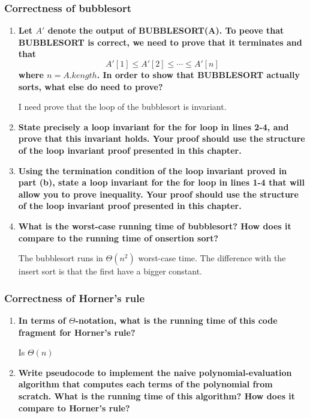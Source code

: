 \documentclass[a4paper,12pt]{article}
\begin{document}
    \subsubsection{Correctness of bubblesort}
    
    \begin{enumerate}
     \item \textbf{ Let $A'$ denote the output of BUBBLESORT(A). To peove
     that BUBBLESORT is correct, we need to prove that it terminates and that
     $$A'[1]\leq A'[2] \leq \cdots \leq A'[n]$$
     where $n = A.kength$. In order to show that BUBBLESORT actually
     sorts, what else do need to prove?}
     
     I need prove that the loop of the bubblesort is invariant.
     
     \item \textbf{State precisely a loop invariant for the for loop in lines 2-4, and
     prove that this invariant holds. Your proof should use the structure of the loop invariant
     proof presented in this chapter.}
     
     \item \textbf{Using the termination condition of the loop invariant proved
     in part (b), state a loop invariant for the for loop in lines 1-4 that will
     allow you to prove inequality. Your proof should use the structure of the loop invariant
     proof presented in this chapter.}
     
     \item \textbf{What is the worst-case running time of bubblesort? How does it compare to
     the running time of onsertion sort?}
     
     The bubblesort runs in $\Theta(n^2)$ worst-case time. The difference
     with the insert sort is that the first have a bigger constant.
     
    \end{enumerate}
    
    \subsubsection{Correctness of Horner's rule}
    
    \begin{enumerate}
     \item \textbf{In terms of $\Theta$-notation, what is the running
     time of this code fragment for Horner's rule?}
     
     Is $\Theta(n)$
     
     \item \textbf{Write pseudocode to implement the naive polynomial-evaluation
     algorithm that computes each terms of the polynomial from scratch.
     What is the running time of this algorithm? How does it compare to Horner's rule?}
     
    \end{enumerate}
    
\end{document}
